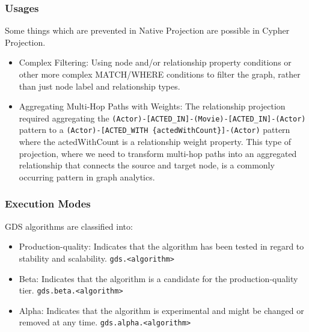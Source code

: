 \begin{frame}[fragile]\frametitle{Usages}

Some things which are prevented in Native Projection are possible in Cypher Projection.
 
\begin{itemize}
\item Complex Filtering: Using node and/or relationship property conditions or other more complex MATCH/WHERE conditions to filter the graph, rather than just node label and relationship types.
\item Aggregating Multi-Hop Paths with Weights: The relationship projection required aggregating the \lstinline|(Actor)-[ACTED_IN]-(Movie)-[ACTED_IN]-(Actor)| pattern to a \lstinline|(Actor)-[ACTED_WITH {actedWithCount}]-(Actor)| pattern where the actedWithCount is a relationship weight property. This type of projection, where we need to transform multi-hop paths into an aggregated relationship that connects the source and target node, is a commonly occurring pattern in graph analytics.
\end{itemize}


\end{frame}


\begin{frame}[fragile]\frametitle{Execution Modes}

GDS algorithms are classified into:


\begin{itemize}
\item Production-quality: Indicates that the algorithm has been tested in regard to stability and scalability. \lstinline|gds.<algorithm>|
\item Beta: Indicates that the algorithm is a candidate for the production-quality tier. \lstinline|gds.beta.<algorithm>|
\item Alpha: Indicates that the algorithm is experimental and might be changed or removed at any time. \lstinline|gds.alpha.<algorithm>|
\end{itemize}

\end{frame}

